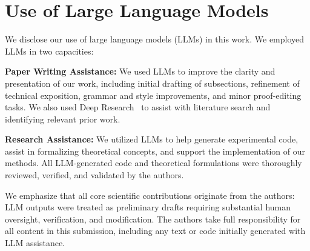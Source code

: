 
\section{Use of Large Language Models}

We disclose our use of large language models (LLMs) in this work. We employed LLMs in two capacities:

\textbf{Paper Writing Assistance:} We used LLMs to improve the clarity and presentation of our work, including initial drafting of subsections, refinement of technical exposition, grammar and style improvements, and minor proof-editing tasks. We also used Deep Research~\citep{openai2025deepresearch} to assist with literature search and identifying relevant prior work.

\textbf{Research Assistance:} We utilized LLMs to help generate experimental code, assist in formalizing theoretical concepts, and support the implementation of our methods. All LLM-generated code and theoretical formulations were thoroughly reviewed, verified, and validated by the authors.

We emphasize that all core scientific contributions originate from the authors: LLM outputs were treated as preliminary drafts requiring substantial human oversight, verification, and modification. The authors take full responsibility for all content in this submission, including any text or code initially generated with LLM assistance.

